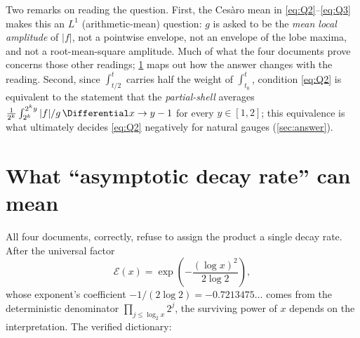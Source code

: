 \documentclass[11pt,oneside]{article}
\theoremstyle{definition}
\theoremstyle{remark}
\begin{document}
Two remarks on reading the question.  First, the Ces\`aro mean in
\eqref{eq:Q2}--\eqref{eq:Q3} makes this an $L^1$ (arithmetic-mean) question:
$g$ is asked to be the \emph{mean local amplitude} of $|f|$, not a pointwise
envelope, not an envelope of the lobe maxima, and not a root-mean-square
amplitude.  Much of what the four documents prove concerns those other
readings; \cref{sec:interpretations} maps out how the answer changes with
the reading.  Second, since $\int_{t/2}^{t}$ carries half the weight of
$\int_{t_0}^{t}$, condition \eqref{eq:Q2} is equivalent to the statement
that the \emph{partial-shell} averages
$\frac{1}{2^k}\int_{2^k}^{2^ky}|f|/g\,\Differential x\to y-1$ for every
$y\in[1,2]$; this equivalence is what ultimately decides \eqref{eq:Q2}
negatively for natural gauges (\cref{sec:answer}).

\section{What ``asymptotic decay rate'' can mean}
\label{sec:interpretations}

All four documents, correctly, refuse to assign the product a single decay
rate.  After the universal factor
\[
 \mathcal E(x)=\exp\!\left(-\frac{(\log x)^2}{2\log2}\right),
\]
whose exponent's coefficient $-1/(2\log2)=-0.7213475\ldots$ comes from the
deterministic denominator $\prod_{j\le\log_2x}2^j$, the surviving power of
$x$ depends on the interpretation.  The verified dictionary:
\end{document}
